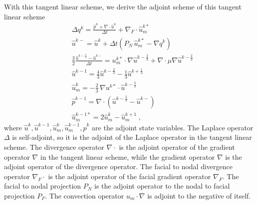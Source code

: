 With this tangent linear scheme, we derive the adjoint scheme of this
tangent linear scheme
\begin{equation} \begin{split} \label{adjscheme}
 & \Delta q^k = \frac{\hat p^k + \nabla \cdot \hat u^k}{\Delta t} +
                \nabla_F \cdot \hat u_m^{k*} \\
 & \hat u^{k-} = \hat u^k + \Delta t \left( P_N\,\hat u_m^{k*} -
                                            \nabla q^k \right) \\
 & \frac 32 \frac{\hat u^{k-\frac23} - \hat u^{k-}}{\Delta t} =
   u_m^{k*} \cdot \nabla \hat u^{k-\frac23}
 + \nabla \cdot \mu \nabla \hat u^{k-\frac23} \\
 & \hat u^{k-1} = \frac43 \hat u^{k-\frac23} - \frac13 \hat u^{k+\frac13} \\
 & \hat u_m^{k} = -\frac23\, \nabla u^{k*} \cdot \hat u^{k-\frac23} \\
 & \hat p^{k-1} = \nabla \cdot \left(\hat u^{k-\frac23} - \hat u^{k-}\right) \\
 & \hat u_m^{k-1*} = 2 \hat u_m^{k} - \hat u_m^{k+1} \;,
\end{split} \end{equation}
where ${\hat u}^k, {\hat u}^{k-1}, {\hat u}_m^k, {\hat u}_m^{k-1}, {\hat p}^k$
are the adjoint state variables.  The Laplace operator $\Delta$ is self-adjoint,
so it is the adjoint of the Laplace operator in the tangent linear scheme.
The divergence operator $\nabla\cdot$ is the adjoint operator of the
gradient operator $\nabla$ in the tangent linear scheme, while the gradient
operator $\nabla$ is the adjoint operator of the divergence operator.
The facial to nodal divergence operator $\nabla_F\cdot$ is the adjoint
operator of the facial gradient operator $\nabla_F$.  The facial to nodal
projection $P_N$ is the adjoint operator to the nodal to facial projection
$P_F$.  The convection operator $u_m \cdot \nabla$ is adjoint to the negative
of itself.

